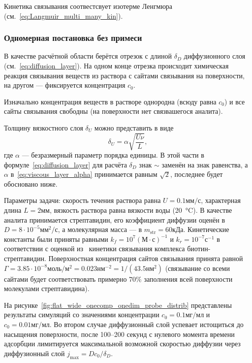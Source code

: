 \documentclass[oneside,final,12pt]{extreport}
\begin{document}
Кинетика связывания соотвестсвует изотерме Ленгмюра
(см.~\eqref{eq:Langmuir_multi_many_kin}).

\subsubsection*{Одномерная постановка без примеси}
В качестве расчётной области берётся отрезок с длиной $\delta_D$
диффузионного слоя (см.~\eqref{eq:diffusion_layer}).
На одном конце отрезка происходит химическая реакция
связывания веществ из раствора с сайтами связывания на поверхности,
на другом --- фиксируется концентрация $c_0$.

Изначально концентрация веществ в растворе однородна (всюду равна $c_0$) и
все сайты связывания свободны (на поверхности нет связвашегося аналита).

Толщину вязкостного слоя $\delta_U$ можно представить в виде
\begin{equation}
  \label{eq:viscous_layer_alpha}
  \delta_U = \alpha\sqrt{\frac{U\nu}{L}},
\end{equation}
где $\alpha$ --- безразмерный параметр порядка единицы.
В этой части в формуле~\eqref{eq:diffusion_layer} для расчёта $\delta_D$
знак $\sim$ заменён на знак равенства, а
$\alpha$ в~\eqref{eq:viscous_layer_alpha} принимается равным $\sqrt{2}$,
последнее будет обосновано ниже.

Параметры задачи:%
скорость течения раствора равна $U = 0.1\text{мм}/\text{с}$,
характерная длина $L = 2\text{мм}$,
вязкость раствора равна вязкости воды (\SI{20}{\celsius}).
В качестве аналита принимается стрептавидин,
его коэффициент диффузии оценён в $D = 8\cdot10^{-5}\text{мм}^2/\text{с}$,
а молекулярная масса --- в $m_{\text{str}} = 60\text{кДа}$.
Кинетические константы были приняты равными%
\label{streptavidin_kinetics}
$k_f = 10^7\left(\text{М}\cdot\text{с}\right)^{-1}$
и $k_r = 10^{-7}\text{с}^{-1}$ в соответствии с оценкой из~%
\cite{bib:biotin_streptavidin_kinetics}
кинетики связывания комплекса биотин-стрептавидин.
Поверхностная концентрация сайтов связывания принята равной%
\label{Gamma0.7}
$\Gamma = 3.85\cdot10^{-8}\text{моль}/\text{м}^2 = 0.023\text{нм}^{-2} = 1/\left(43.5\text{нм}^2\right)$
(связывание со всеми сайтами будет соответствовать примерно
70\% заполнения всей поверхности молекулами стрептавидина).

На рисунке~\ref{fig:flat_wide_onecomp_onedim_probe_distrib}
представлены результаты симуляций со значениями концентрации
$c_0 = 0.1 \text{мг}/\text{мл}$ и $c_0 = 0.01 \text{мг}/\text{мл}$.
Во втором случае диффузионный слой успевает истощиться до насыщения поверхности,
после 100--200 секунд с нулевого момента времени адсорбции лимитируется
максимальной возможной скоростью диффузии через диффузионный слой
$j_{\text{max}} = D c_0 / \delta_D$.
\end{document}
